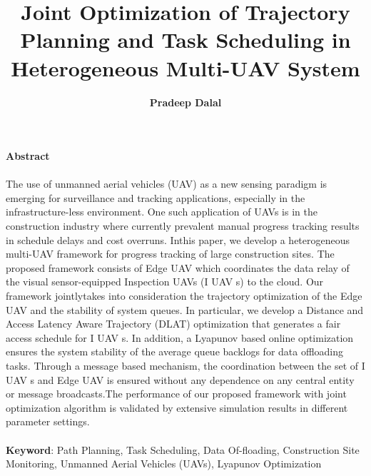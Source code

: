 \documentclass[11pt,twocolumn]{article}
\title{\vspace{-4.0cm}Joint Optimization of Trajectory Planning and Task Scheduling in
Heterogeneous Multi-UAV System}
\author{\textbf{Pradeep Dalal}}
\date{\vspace{-5ex}}
\begin{document}
\maketitle
\vspace{50px}

{\LARGE \textbf{Abstract}}
\\\\
The use of unmanned aerial vehicles (UAV) as a new sensing paradigm is emerging for surveillance and tracking
applications, especially in the infrastructure-less environment. One such application of UAVs is in the construction industry where currently prevalent manual progress tracking results in schedule delays and cost overruns. Inthis paper, we develop a heterogeneous multi-UAV framework for progress tracking of large construction sites. The proposed framework consists of Edge UAV which coordinates the data relay of the visual sensor-equipped Inspection UAVs (I UAV s) to the cloud. Our framework jointlytakes into consideration the trajectory optimization of the Edge UAV and the stability of system queues. In particular, we develop a Distance and Access Latency Aware Trajectory (DLAT) optimization that generates a fair access schedule for I UAV s. In addition, a Lyapunov based online optimization ensures the system stability of the average queue backlogs for data offloading tasks. Through a message based mechanism, the coordination between the set of I UAV s and Edge UAV is ensured without any dependence on any central entity or message broadcasts.The performance of our proposed framework with joint optimization algorithm is validated by extensive simulation results in different parameter settings.\\\\
 \textbf{Keyword}: Path Planning, Task Scheduling, Data Of-floading, Construction Site Monitoring, Unmanned Aerial Vehicles (UAVs), Lyapunov Optimization
\end{document}
